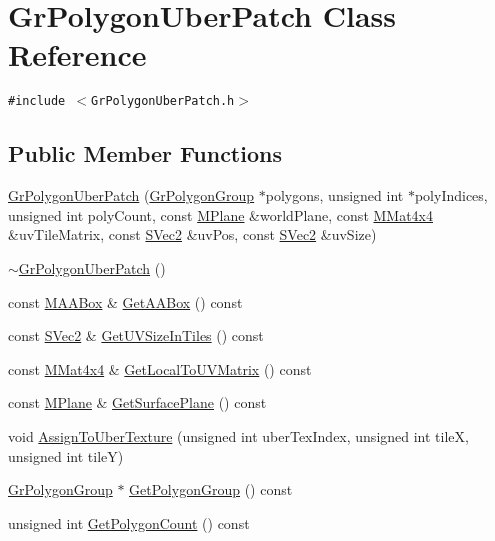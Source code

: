 \hypertarget{class_gr_polygon_uber_patch}{
\section{GrPolygonUberPatch Class Reference}
\label{class_gr_polygon_uber_patch}
}
{\tt \#include $<$GrPolygonUberPatch.h$>$}

\subsection*{Public Member Functions}
\begin{CompactItemize}
\item 
\hyperlink{class_gr_polygon_uber_patch_e8720aea58f72f311e4350973a2e7cab}{GrPolygonUberPatch} (\hyperlink{class_gr_polygon_group}{GrPolygonGroup} $\ast$polygons, unsigned int $\ast$polyIndices, unsigned int polyCount, const \hyperlink{class_m_plane}{MPlane} \&worldPlane, const \hyperlink{class_m_mat4x4}{MMat4x4} \&uvTileMatrix, const \hyperlink{struct_s_vec2}{SVec2} \&uvPos, const \hyperlink{struct_s_vec2}{SVec2} \&uvSize)
\item 
\hyperlink{class_gr_polygon_uber_patch_da0fadb60007621660d501dabaf55a26}{$\sim$GrPolygonUberPatch} ()
\item 
const \hyperlink{class_m_a_a_box}{MAABox} \& \hyperlink{class_gr_polygon_uber_patch_5dce15b73ce4d3df04e23a0ea2a168c8}{GetAABox} () const 
\item 
const \hyperlink{struct_s_vec2}{SVec2} \& \hyperlink{class_gr_polygon_uber_patch_0ee8cbafeeb0689c62e1789d6c016574}{GetUVSizeInTiles} () const 
\item 
const \hyperlink{class_m_mat4x4}{MMat4x4} \& \hyperlink{class_gr_polygon_uber_patch_a2904f797da76512d80ede9386a0eadb}{GetLocalToUVMatrix} () const 
\item 
const \hyperlink{class_m_plane}{MPlane} \& \hyperlink{class_gr_polygon_uber_patch_19e95a74d689a75115f1fc8b46cd43d4}{GetSurfacePlane} () const 
\item 
void \hyperlink{class_gr_polygon_uber_patch_8504312de783f8dfe605932337209cd9}{AssignToUberTexture} (unsigned int uberTexIndex, unsigned int tileX, unsigned int tileY)
\item 
\hyperlink{class_gr_polygon_group}{GrPolygonGroup} $\ast$ \hyperlink{class_gr_polygon_uber_patch_1878a2441e199c1eeaa18a552c38311a}{GetPolygonGroup} () const 
\item 
unsigned int \hyperlink{class_gr_polygon_uber_patch_a47f629d10e1fe72be7ba2407626feca}{GetPolygonCount} () const 

\end{CompactItemize}
